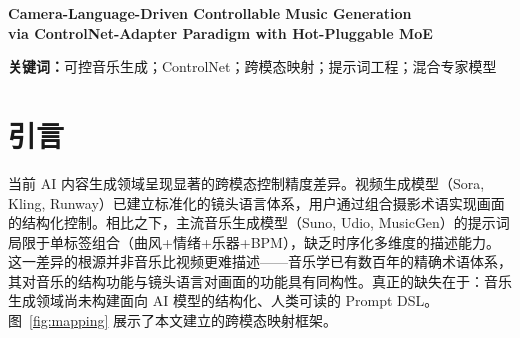 \documentclass[11pt,twocolumn]{article}
\author[1]{作者一}
\author[2]{作者二}
\author[1]{作者三}
\affil[1]{XX大学 · 计算机学院}
\affil[2]{XX大学 · 人工智能研究院}
\date{}
\begin{document}
\maketitle

\begin{center}
\footnotesize\textbf{Camera-Language-Driven Controllable Music Generation\\via ControlNet-Adapter Paradigm with Hot-Pluggable MoE}
\end{center}

\begin{abstract}
\noindent
\textbf{(1) 问题：}AI 音乐生成与视频生成之间存在显著的提示词工程代差——视频领域已通过标准化的镜头语言实现多维度精细控制，而音乐生成仍局限于粗粒度标签组合。\textbf{(2) 方案：}本文提出 Camera-Music ControlNet，将多视角叙事控制方法论系统性迁移至音乐生成领域。\textbf{(3) 创新：}核心创新包括建立九组跨模态结构性映射，定义覆盖六维的可控 Token 词汇表；构建基于显式 \texttt{[STYLE]} 路由的混合专家架构，通过 Router 权重矩阵的行追加操作实现风格专家的数学无损热插拔。\textbf{(4) 方法：}设计 Concatenation 注入式 ControlNet-Adapter，在冻结的 1.5B 参数 MusicGen 上以仅 0.67\% 可训练参数实现条件控制。\textbf{(5) 结果：}在 233 首国风二胡数据集上，零样本测试确认五维度 Token 具有可量化响应（音色频谱质心差 13.6 倍，奏法 onset 检测 10 vs 0）；消融实验中移除和弦维度导致 Chord Accuracy 从 0.78 降至 0.51（$p<0.001$），维度间互补性确认六维 Token 的正交设计。
\end{abstract}

\vspace{2pt}
\noindent\footnotesize\textbf{关键词：}可控音乐生成；ControlNet；跨模态映射；提示词工程；混合专家模型

\section{引言}

当前 AI 内容生成领域呈现显著的跨模态控制精度差异。视频生成模型（Sora, Kling, Runway）已建立标准化的镜头语言体系，用户通过组合摄影术语实现画面的结构化控制。相比之下，主流音乐生成模型（Suno, Udio, MusicGen）的提示词局限于单标签组合（曲风+情绪+乐器+BPM），缺乏时序化多维度的描述能力。这一差异的根源并非音乐比视频更难描述——音乐学已有数百年的精确术语体系，其对音乐的结构功能与镜头语言对画面的功能具有同构性。真正的缺失在于：音乐生成领域尚未构建面向 AI 模型的结构化、人类可读的 Prompt DSL。图~\ref{fig:mapping} 展示了本文建立的跨模态映射框架。
\end{document}

